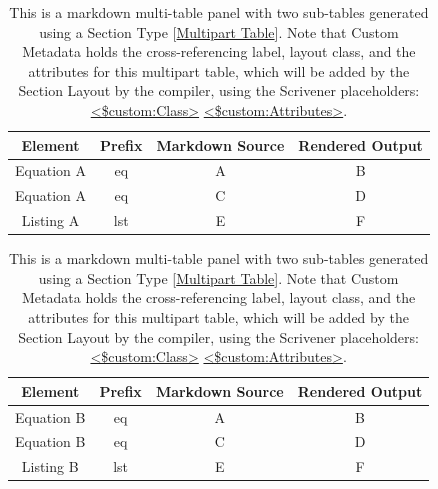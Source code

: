 \documentclass[
  12pt,
  a4paper,
  oneside,
  numbers=noenddot,
  titlepage,
  toclink=all,
  toc=bibliography]{scrbook}
\theoremstyle{definition}
\theoremstyle{definition}
\theoremstyle{definition}
\theoremstyle{plain}
\theoremstyle{plain}
\theoremstyle{plain}
\theoremstyle{plain}
\theoremstyle{plain}
\theoremstyle{remark}
\begin{document}
\begin{table}

\begin{minipage}[t]{\linewidth}

{\centering 

\begin{tabular}[t]{cccc}
\toprule
\textbf{Element} & \textbf{Prefix} & \textbf{Markdown
Source} & \textbf{Rendered Output}\\
\midrule
Equation A & eq & A & B\\
Equation A & eq & C & D\\
Listing A & lst & E & F\\
\bottomrule
\end{tabular}

}

\end{minipage}%
\newline
\begin{minipage}[t]{\linewidth}

{\centering 

\begin{tabular}[t]{cccc}
\toprule
\textbf{Element} & \textbf{Prefix} & \textbf{Markdown
Source} & \textbf{Rendered Output}\\
\midrule
Equation B & eq & A & B\\
Equation B & eq & C & D\\
Listing B & lst & E & F\\
\bottomrule
\end{tabular}

}

\end{minipage}%

\caption{\label{tbl-scriv32}This is a markdown multi-table panel with
two sub-tables generated using a Section Type {[}\ul{Multipart
Table}{]}. Note that Custom Metadata holds the cross-referencing label,
layout class, and the attributes for this multipart table, which will be
added by the Section Layout by the compiler, using the Scrivener
placeholders:
\ul{\textless\hspace{0pt}\$\hspace{0pt}\hspace{0pt}custom:Class\textgreater{}}
\ul{\textless\hspace{0pt}\$\hspace{0pt}\hspace{0pt}custom:Attributes\textgreater{}}.}

\end{table}
\end{document}
